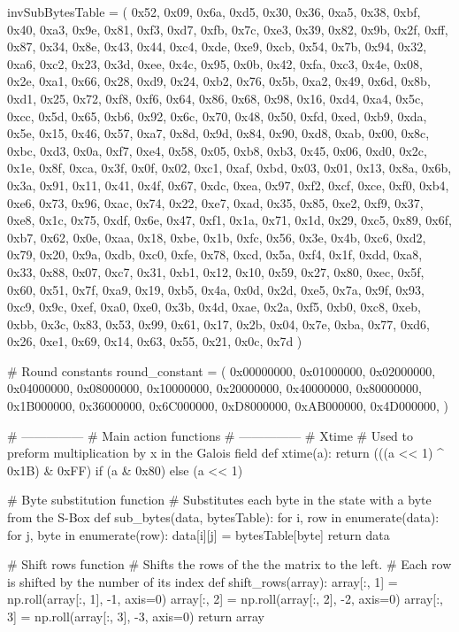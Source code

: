 \begin{python}
invSubBytesTable = (
    0x52, 0x09,	0x6a, 0xd5, 0x30, 0x36,	0xa5, 0x38,	0xbf, 0x40,	0xa3, 0x9e, 0x81, 0xf3, 0xd7, 0xfb,
    0x7c, 0xe3,	0x39, 0x82, 0x9b, 0x2f,	0xff, 0x87,	0x34, 0x8e,	0x43, 0x44, 0xc4, 0xde, 0xe9, 0xcb,
    0x54, 0x7b,	0x94, 0x32, 0xa6, 0xc2,	0x23, 0x3d,	0xee, 0x4c,	0x95, 0x0b, 0x42, 0xfa, 0xc3, 0x4e,
    0x08, 0x2e,	0xa1, 0x66, 0x28, 0xd9,	0x24, 0xb2,	0x76, 0x5b,	0xa2, 0x49, 0x6d, 0x8b, 0xd1, 0x25,
    0x72, 0xf8,	0xf6, 0x64, 0x86, 0x68,	0x98, 0x16,	0xd4, 0xa4,	0x5c, 0xcc, 0x5d, 0x65, 0xb6, 0x92,
    0x6c, 0x70,	0x48, 0x50, 0xfd, 0xed,	0xb9, 0xda,	0x5e, 0x15,	0x46, 0x57, 0xa7, 0x8d, 0x9d, 0x84,
    0x90, 0xd8,	0xab, 0x00, 0x8c, 0xbc,	0xd3, 0x0a,	0xf7, 0xe4,	0x58, 0x05, 0xb8, 0xb3, 0x45, 0x06,
    0xd0, 0x2c,	0x1e, 0x8f, 0xca, 0x3f,	0x0f, 0x02,	0xc1, 0xaf,	0xbd, 0x03, 0x01, 0x13, 0x8a, 0x6b,
    0x3a, 0x91,	0x11, 0x41, 0x4f, 0x67,	0xdc, 0xea,	0x97, 0xf2,	0xcf, 0xce, 0xf0, 0xb4, 0xe6, 0x73,
    0x96, 0xac,	0x74, 0x22, 0xe7, 0xad,	0x35, 0x85,	0xe2, 0xf9,	0x37, 0xe8, 0x1c, 0x75, 0xdf, 0x6e,
    0x47, 0xf1,	0x1a, 0x71, 0x1d, 0x29,	0xc5, 0x89,	0x6f, 0xb7,	0x62, 0x0e, 0xaa, 0x18, 0xbe, 0x1b,
    0xfc, 0x56,	0x3e, 0x4b, 0xc6, 0xd2,	0x79, 0x20,	0x9a, 0xdb,	0xc0, 0xfe, 0x78, 0xcd, 0x5a, 0xf4,
    0x1f, 0xdd,	0xa8, 0x33, 0x88, 0x07,	0xc7, 0x31,	0xb1, 0x12,	0x10, 0x59, 0x27, 0x80, 0xec, 0x5f,
    0x60, 0x51,	0x7f, 0xa9, 0x19, 0xb5,	0x4a, 0x0d,	0x2d, 0xe5,	0x7a, 0x9f, 0x93, 0xc9, 0x9c, 0xef,
    0xa0, 0xe0,	0x3b, 0x4d, 0xae, 0x2a,	0xf5, 0xb0,	0xc8, 0xeb,	0xbb, 0x3c, 0x83, 0x53, 0x99, 0x61,
    0x17, 0x2b,	0x04, 0x7e, 0xba, 0x77,	0xd6, 0x26,	0xe1, 0x69,	0x14, 0x63, 0x55, 0x21, 0x0c, 0x7d
    )

# Round constants
round_constant = (
    0x00000000, 0x01000000, 0x02000000,
    0x04000000, 0x08000000, 0x10000000,
    0x20000000, 0x40000000, 0x80000000,
    0x1B000000, 0x36000000, 0x6C000000,
    0xD8000000, 0xAB000000, 0x4D000000,
    )


# ---------------
# Main action functions
# ---------------
# Xtime
# Used to preform multiplication by x in the Galois field
def xtime(a):
    return (((a << 1) ^ 0x1B) & 0xFF) if (a & 0x80) else (a << 1)


# Byte substitution function
# Substitutes each byte in the state with a byte from the S-Box
def sub_bytes(data, bytesTable):
    for i, row in enumerate(data):
        for j, byte in enumerate(row):
            data[i][j] = bytesTable[byte]
    return data


# Shift rows function
# Shifts the rows of the the matrix to the left.
# Each row is shifted by the number of its index
def shift_rows(array):
    array[:, 1] = np.roll(array[:, 1], -1, axis=0)
    array[:, 2] = np.roll(array[:, 2], -2, axis=0)
    array[:, 3] = np.roll(array[:, 3], -3, axis=0)
    return array



\end{python}

